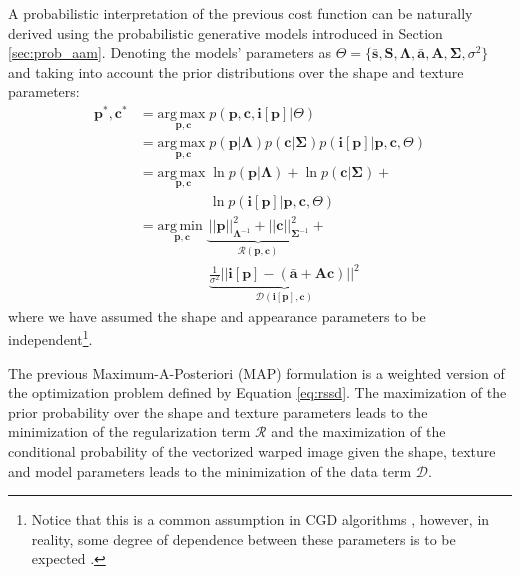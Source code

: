 A probabilistic interpretation of the previous cost function can be naturally derived using the probabilistic generative models introduced in Section \ref{sec:prob_aam}. Denoting the models' parameters as \mbox{$\Theta = \{\mathbf{\bar{s}}, \mathbf{S}, \mathbf{\Lambda}, \mathbf{\bar{a}}, \mathbf{A}, \mathbf{\Sigma}, \sigma^2\}$} and taking into account the prior distributions over the shape and texture parameters:
\begin{equation}
    \begin{aligned}
        \mathbf{p}^*, \mathbf{c}^* & = \underset{\mathbf{p}, \mathbf{c}}{\mathrm{arg\,max\;}} p(\mathbf{p}, \mathbf{c}, \mathbf{i}[\mathbf{p}] | \Theta) 
        \\
        & = \underset{\mathbf{p}, \mathbf{c}}{\mathrm{arg\,max\;}}  p(\mathbf{p} | \mathbf{\Lambda})  p(\mathbf{c} | \mathbf{\Sigma}) p(\mathbf{i}[\mathbf{p}] |
        \mathbf{p}, \mathbf{c}, \Theta)  
        \\
        & = \underset{\mathbf{p}, \mathbf{c}}{\mathrm{arg\,max\;}}  \ln p(\mathbf{p} | \mathbf{\Lambda}) + \ln p(\mathbf{c} | \mathbf{\Sigma}) +
        \\
        & \qquad \qquad \quad \ln p(\mathbf{i}[\mathbf{p}] | \mathbf{p}, \mathbf{c}, \Theta)
        \\
        & = \underset{\mathbf{p}, \mathbf{c}}{\mathrm{arg\,min\;}}  \underbrace{\frac{}{} ||\mathbf{p}||^2_{\mathbf{\Lambda}^{-1}} + ||\mathbf{c}||^2_{\mathbf{\Sigma}^{-1}}}_{\mathcal{R}(\mathbf{p}, \mathbf{c})} +
        \\
        & \qquad \qquad \quad  \underbrace{ \frac{1}{\sigma^2} || \mathbf{i}[\mathbf{p}] - (\mathbf{\bar{a}} + \mathbf{A} \mathbf{c}) ||^2}_{\mathcal{D}(\mathbf{i}[\mathbf{p}], \mathbf{c})} 
    \end{aligned}
    \label{eq:prob_rssd}
\end{equation}
where we have assumed the shape and appearance parameters to be independent\footnote{Notice that this is a common assumption in CGD algorithms \cite{Matthews2004}, however, in reality, some degree of dependence between these parameters is to be expected \cite{Cootes2001}.}.

The previous Maximum-A-Posteriori (MAP) formulation is a weighted version of the optimization problem defined by Equation \ref{eq:rssd}. The maximization of the prior probability over the shape and texture parameters leads to the minimization of the regularization term $\mathcal{R}$ and the maximization of the conditional probability of the vectorized warped image given the shape, texture and model parameters leads to the minimization of the data term $\mathcal{D}$.

